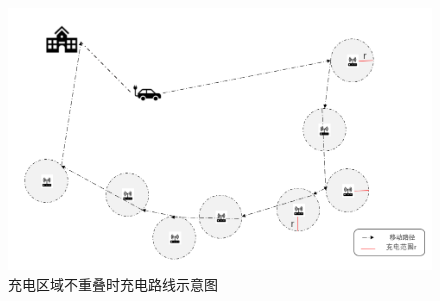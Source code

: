 \documentclass{whutmod}
\begin{document}
                \begin{figure}[H]
                    \centering
                    \includegraphics[width=.8\textwidth]{figures/bufu.png}
                    \caption{充电区域不重叠时充电路线示意图}\label{asffa}
                \end{figure}
\end{document}
